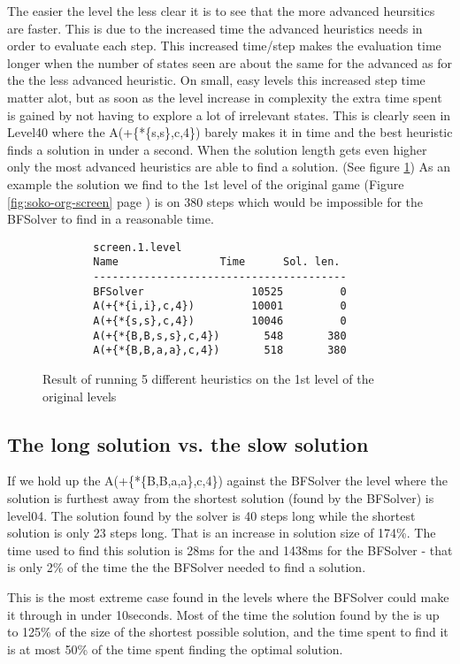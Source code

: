 The easier the level the less clear it is to see that the more advanced heursitics are faster. This is due to the increased time the advanced heuristics needs in order to evaluate each step. This increased time/step makes the evaluation time longer when the number of states seen are about the same for the advanced as for the the less advanced heuristic. On small, easy levels this increased step time matter alot, but as soon as the level increase in complexity the extra time spent is gained by not having to explore a lot of irrelevant states. This is clearly seen in Level40 where the A(+\{*\{s,s\},c,4\}) barely makes it in time and the best heuristic finds a solution in under a second. When the solution length gets even higher only the most advanced heuristics are able to find a solution. (See figure \ref{fig:std1solution}) As an example the solution we find to the 1st level of the original game (Figure \ref{fig:soko-org-screen} page \pageref{fig:soko-org-screen}) is on 380 steps which would be impossible for the BFSolver to find in a reasonable time.
\begin{figure}[htp]
\begin{verbatim}
		screen.1.level
		Name                Time      Sol. len. 
		----------------------------------------
		BFSolver                 10525         0
		A(+{*{i,i},c,4})         10001         0
		A(+{*{s,s},c,4})         10046         0
		A(+{*{B,B,s,s},c,4})       548       380
		A(+{*{B,B,a,a},c,4})       518       380
\end{verbatim}
	\caption{Result of running 5 different heuristics on the 1st level of the original levels}
	\label{fig:std1solution}
\end{figure}

\subsection{The long solution vs. the slow solution}
If we hold up the A(+\{*\{B,B,a,a\},c,4\}) against the BFSolver the level where the \astar solution is furthest away from the shortest solution (found by the BFSolver) is level04. The solution found by the \astar solver is 40 steps long while the shortest solution is only 23 steps long. That is an increase in solution size of 174\%.
The time used to find this solution is 28ms for the \astar and 1438ms for the BFSolver - that is only 2\% of the time the the BFSolver needed to find a solution.

This is the most extreme case found in the levels where the BFSolver could make it through in under 10seconds. Most of the time the solution found by the \astar is up to 125\% of the size of the shortest possible solution, and the time spent to find it is at most 50\% of the time spent finding the optimal solution.

